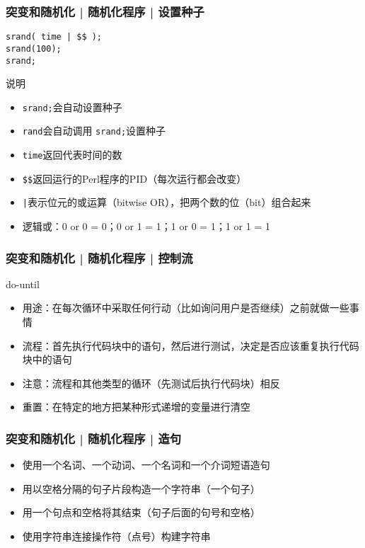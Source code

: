 \begin{frame}[fragile]
  \frametitle{突变和随机化 | 随机化程序 | \alert{设置种子}}
  \vspace{-1.5em}
\begin{lstlisting}
srand( time | $$ );
srand(100);
srand;
\end{lstlisting}
\begin{block}{说明}
  \begin{itemize}
    \item \verb|srand;|会自动设置种子
    \item \verb|rand|会自动调用 \verb|srand;|设置种子
    \item \verb|time|返回代表时间的数
    \item \verb|$$|返回运行的Perl程序的PID（每次运行都会改变）
    \item \verb=|=表示位元的或运算（bitwise OR），把两个数的位（bit）组合起来
    \item 逻辑或：0 or 0 = 0；0 or 1 = 1；1 or 0 = 1；1 or 1 = 1
  \end{itemize}
\end{block}
\end{frame}

\begin{frame}
  \frametitle{突变和随机化 | 随机化程序 | \alert{控制流}}
  \begin{block}{do-until}
    \begin{itemize}
      \item 用途：在每次循环中采取任何行动（比如询问用户是否继续）之前就做一些事情
      \item 流程：首先执行代码块中的语句，然后进行测试，决定是否应该重复执行代码块中的语句
      \item 注意：流程和其他类型的循环（先测试后执行代码块）相反
      \item 重置：在特定的地方把某种形式递增的变量进行清空
    \end{itemize}
  \end{block}
\end{frame}

\begin{frame}
  \frametitle{突变和随机化 | 随机化程序 | 造句}
  \begin{itemize}
    \item 使用一个名词、一个动词、一个名词和一个介词短语造句
    \item 用以空格分隔的句子片段构造一个字符串（一个句子）
    \item 用一个句点和空格将其结束（句子后面的句号和空格）
    \item 使用字符串连接操作符（点号）构建字符串
  \end{itemize}
\end{frame}

